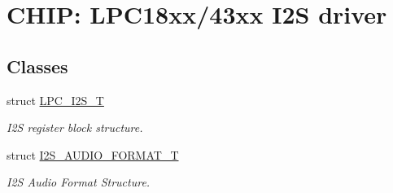 \hypertarget{group___i2_s__18_x_x__43_x_x}{}\section{C\+H\+IP\+: L\+P\+C18xx/43xx I2S driver}
\label{group___i2_s__18_x_x__43_x_x}
\subsection*{Classes}
\begin{DoxyCompactItemize}
\item 
struct \hyperlink{struct_l_p_c___i2_s___t}{L\+P\+C\+\_\+\+I2\+S\+\_\+T}
\begin{DoxyCompactList}\small\item\em I2S register block structure. \end{DoxyCompactList}\item 
struct \hyperlink{struct_i2_s___a_u_d_i_o___f_o_r_m_a_t___t}{I2\+S\+\_\+\+A\+U\+D\+I\+O\+\_\+\+F\+O\+R\+M\+A\+T\+\_\+T}
\begin{DoxyCompactList}\small\item\em I2S Audio Format Structure. \end{DoxyCompactList}\end{DoxyCompactItemize}
